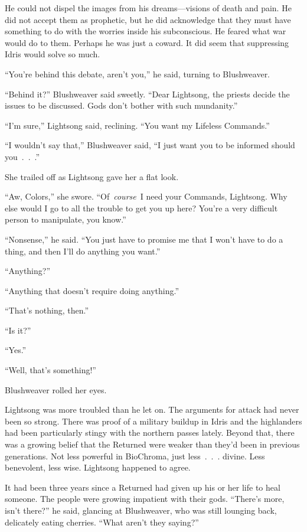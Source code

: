 He could not dispel the images from his dreams—visions of death and pain. He did not accept them as prophetic, but he did acknowledge that they must have something to do with the worries inside his subconscious. He feared what war would do to them. Perhaps he was just a coward. It did seem that suppressing Idris would solve so much.

“You’re behind this debate, aren’t you,” he said, turning to Blushweaver.

“Behind it?” Blushweaver said sweetly. “Dear Lightsong, the priests decide the issues to be discussed. Gods don’t bother with such mundanity.”

“I’m sure,” Lightsong said, reclining. “You want my Lifeless Commands.”

“I wouldn’t say that,” Blushweaver said, “I just want you to be informed should you~.~.~.”

She trailed off as Lightsong gave her a flat look.

“Aw, Colors,” she swore. “Of~\textit{course}~I need your Commands, Lightsong. Why else would I go to all the trouble to get you up here? You’re a very difficult person to manipulate, you know.”

“Nonsense,” he said. “You just have to promise me that I won’t have to do a thing, and then I’ll do anything you want.”

“Anything?”

“Anything that doesn’t require doing anything.”

“That’s nothing, then.”

“Is it?”

“Yes.”

“Well, that’s something!”

Blushweaver rolled her eyes.

Lightsong was more troubled than he let on. The arguments for attack had never been so strong. There was proof of a military buildup in Idris and the highlanders had been particularly stingy with the northern passes lately. Beyond that, there was a growing belief that the Returned were weaker than they’d been in previous generations. Not less powerful in BioChroma, just less~.~.~. divine. Less benevolent, less wise. Lightsong happened to agree.

It had been three years since a Returned had given up his or her life to heal someone. The people were growing impatient with their gods. “There’s more, isn’t there?” he said, glancing at Blushweaver, who was still lounging back, delicately eating cherries. “What aren’t they saying?”

